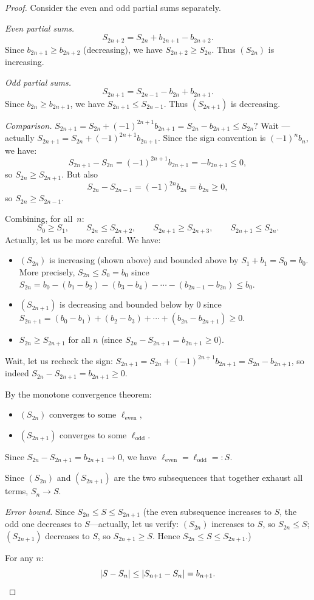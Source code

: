 \documentclass[12pt,a4paper,openany]{book}
\newcommand{\abs}[1]{\left\lvert #1 \right\rvert}
\theoremstyle{definition}
\theoremstyle{remark}
\begin{document}
\begin{proof}
Consider the even and odd partial sums separately.

\textit{Even partial sums.}
\[
   S_{2n+2} = S_{2n} + b_{2n+1} - b_{2n+2}.
\]
Since $b_{2n+1} \geq b_{2n+2}$ (decreasing), we have $S_{2n+2} \geq S_{2n}$.
Thus $(S_{2n})$ is increasing.

\textit{Odd partial sums.}
\[
   S_{2n+1} = S_{2n-1} - b_{2n} + b_{2n+1}.
\]
Since $b_{2n} \geq b_{2n+1}$, we have $S_{2n+1} \leq S_{2n-1}$.
Thus $(S_{2n+1})$ is decreasing.

\textit{Comparison.}
$S_{2n+1} = S_{2n} + (-1)^{2n+1}b_{2n+1} = S_{2n} - b_{2n+1} \leq S_{2n}$?
Wait --- actually $S_{2n+1} = S_{2n} + (-1)^{2n+1}b_{2n+1}$. Since the sign
convention is $(-1)^n b_n$, we have:
\[
   S_{2n+1} - S_{2n} = (-1)^{2n+1}b_{2n+1} = -b_{2n+1} \leq 0,
\]
so $S_{2n} \geq S_{2n+1}$. But also
\[
   S_{2n} - S_{2n-1} = (-1)^{2n}b_{2n} = b_{2n} \geq 0,
\]
so $S_{2n} \geq S_{2n-1}$.

Combining, for all~$n$:
\[
   S_0 \geq S_1, \qquad
   S_{2n} \leq S_{2n+2}, \qquad
   S_{2n+1} \geq S_{2n+3}, \qquad
   S_{2n+1} \leq S_{2n}.
\]
Actually, let us be more careful. We have:
\begin{itemize}
\item $(S_{2n})$ is increasing (shown above) and bounded above by $S_1 + b_1 = S_0 = b_0$.
      More precisely, $S_{2n} \leq S_0 = b_0$ since
      $S_{2n} = b_0 - (b_1 - b_2) - (b_3 - b_4) - \cdots - (b_{2n-1} - b_{2n}) \leq b_0$.
\item $(S_{2n+1})$ is decreasing and bounded below by $0$ since
      $S_{2n+1} = (b_0 - b_1) + (b_2 - b_3) + \cdots + (b_{2n} - b_{2n+1}) \geq 0$.
\item $S_{2n} \geq S_{2n+1}$ for all $n$ (since $S_{2n} - S_{2n+1} = b_{2n+1} \geq 0$).
\end{itemize}

Wait, let us recheck the sign: $S_{2n+1} = S_{2n} + (-1)^{2n+1}b_{2n+1} = S_{2n} - b_{2n+1}$,
so indeed $S_{2n} - S_{2n+1} = b_{2n+1} \geq 0$.

By the monotone convergence theorem:
\begin{itemize}
\item $(S_{2n})$ converges to some $\ell_{\text{even}}$,
\item $(S_{2n+1})$ converges to some $\ell_{\text{odd}}$.
\end{itemize}
Since $S_{2n} - S_{2n+1} = b_{2n+1} \to 0$, we have
$\ell_{\text{even}} = \ell_{\text{odd}} =: S$.

Since $(S_{2n})$ and $(S_{2n+1})$ are the two subsequences that together
exhaust all terms, $S_n \to S$.

\medskip
\textit{Error bound.}
Since $S_{2n} \leq S \leq S_{2n+1}$ (the even subsequence increases to $S$,
the odd one decreases to $S$---actually, let us verify: $(S_{2n})$ increases
to $S$, so $S_{2n} \leq S$; $(S_{2n+1})$ decreases to $S$, so $S_{2n+1} \geq S$.
Hence $S_{2n} \leq S \leq S_{2n+1}$.)

For any $n$:
\[
   \abs{S - S_n} \leq \abs{S_{n+1} - S_n} = b_{n+1}. \qedhere
\]
\end{proof}
\end{document}
